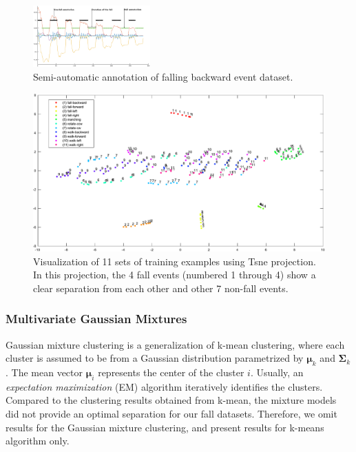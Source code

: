 \documentclass[]{IEEEtran}
\begin{document}
\begin{figure}[b]
\centering
\includegraphics[width=0.4\textwidth]{plots/human_falling_backward2.eps} 
\caption{Semi-automatic annotation of falling backward event dataset.}
 \label{fig:automatic_annotation2} 
\end{figure}

\begin{figure}[!bht]
\centering
\includegraphics[width=.85\textwidth]{figures/viz_all_training_examples_crop2.pdf} 
\caption{Visualization of 11 sets of training examples using Tsne projection.
In this projection, the 4 fall events (numbered 1 through 4) show a clear
separation from each other and other 7 non-fall events.}
\label{fig:automatic_annotation3} 
\end{figure}

\subsubsection{Multivariate Gaussian Mixtures}
Gaussian mixture clustering is a generalization of k-mean clustering, where
each cluster is assumed to be from a Gaussian distribution parametrized by
$\boldsymbol{\mu}_k$ and $\boldsymbol{\Sigma}_k$. The mean vector
$\boldsymbol{\mu}_i$ represents the center of the cluster $i$.  Usually, an
\emph{expectation maximization} (EM) algorithm iteratively identifies the
clusters. Compared to the clustering results obtained from k-mean, the mixture
models did not provide an optimal separation for our fall datasets. Therefore,
we omit results for the Gaussian mixture clustering, and present results for
k-means algorithm only. 
\end{document}
